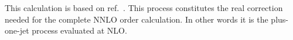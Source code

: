 \label{subsec:stop}
\label{single-top-quark-production-and-decay-at-nnlo}

This calculation is based on ref.~\cite{Campbell:2020fhf}.
This process constitutes the real correction 
needed for the complete NNLO order calculation. In other words
it is the plus-one-jet process evaluated at NLO.
